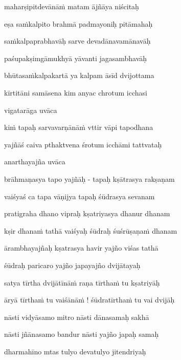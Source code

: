 maharṣipitdevānāṁ matam ājñāya niścitaḥ \danda\dontdisplaylinenum

eṣa saṁkalpito brahmā padmayoniḥ pitāmahaḥ \veg\dontdisplaylinenum

saṁkalpaprabhavāḥ sarve devadānavamānavāḥ\thinspace{\dandab} \dontdisplaylinenum

paśupakṣimgāmukhyā yāvanti jagasambhavāḥ \veg\dontdisplaylinenum

bhūtasaṁkalpakartā ya kalpam āsīd dvijottama\thinspace{\dandab} \dontdisplaylinenum

kīrtitāni samāsena kim anyac chrotum icchasi \veg\dontdisplaylinenum

vigatarāga uvāca~{\dandab}\dontdisplaylinenum 

kiṁ tapaḥ sarvavarṇānāṁ vttir vāpi tapodhana\thinspace{\danda} \dontdisplaylinenum

yajñāś caiva pthaktvena śrotum icchāmi tattvataḥ \veg\dontdisplaylinenum

anarthayajña uvāca~{\dandab}\dontdisplaylinenum 

brāhmaṇasya tapo yajñāḥ - tapaḥ kṣātrasya rakṣaṇam\thinspace{\danda} \dontdisplaylinenum

vaiśyaś ca tapa vāṇijya tapaḥ śūdrasya sevanam \veg\dontdisplaylinenum

pratigraha dhano vipraḥ kṣatriyasya dhanur dhanam\thinspace{\dandab} \dontdisplaylinenum

kṣir dhanaṁ tathā vaiśyaḥ śūdraḥ śuśrūṣaṇaṁ dhanam \veg\dontdisplaylinenum

ārambhayajñaḥ kṣatrasya havir yajño viśas tathā\thinspace{\dandab} \dontdisplaylinenum

śūdraḥ paricaro yajño japayajño dvijātayaḥ \veg\dontdisplaylinenum

satya tīrtha dvijātīnāṁ raṇa tīrthaṁ tu kṣatriyāḥ\thinspace{\dandab} \dontdisplaylinenum

āryā tīrthaṁ tu vaiśānāṁ ! śūdratīrthaṁ tu vai dvijāḥ \veg\dontdisplaylinenum

nāsti vidyāsamo mitro nāsti dānasamaḥ sakhā\thinspace{\dandab} \dontdisplaylinenum

nāsti jñānasamo bandur nāsti yajño japaḥ samaḥ \veg\dontdisplaylinenum

dharmahīno mtas tulyo devatulyo jitendriyaḥ\thinspace{\dandab} \dontdisplaylinenum

